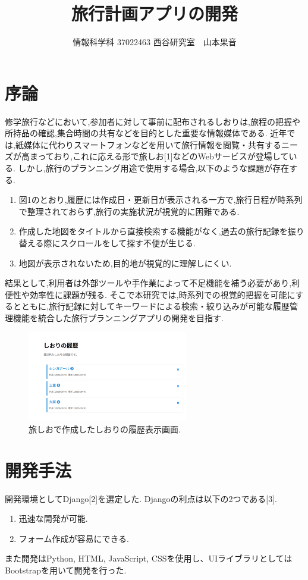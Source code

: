 \documentclass[a4j,twocolumn]{jsarticle}
\begin{document}
  \title{旅行計画アプリの開発}
  \author{情報科学科 \hspace{5mm} 37022463 \hspace{5mm} 西谷研究室　山本果音}
  \date{}

  \maketitle


\section{序論}
\label{sec:org1c60c1a}
修学旅行などにおいて,参加者に対して事前に配布されるしおりは,旅程の把握や所持品の確認,集合時間の共有などを目的とした重要な情報媒体である.
近年では,紙媒体に代わりスマートフォンなどを用いて旅行情報を閲覧・共有するニーズが高まっており,これに応える形で旅しお[1]などのWebサービスが登場している.
しかし,旅行のプランニング用途で使用する場合,以下のような課題が存在する.
\begin{enumerate}
\item 図1のとおり,履歴には作成日・更新日が表示される一方で,旅行日程が時系列で整理されておらず,旅行の実施状況が視覚的に困難である.
\item 作成した地図をタイトルから直接検索する機能がなく,過去の旅行記録を振り替える際にスクロールをして探す不便が生じる.
\item 地図が表示されないため,目的地が視覚的に理解しにくい.
\end{enumerate}
結果として,利用者は外部ツールや手作業によって不足機能を補う必要があり,利便性や効率性に課題が残る.
そこで本研究では,時系列での視覚的把握を可能にするとともに,旅行記録に対してキーワードによる検索・絞り込みが可能な履歴管理機能を統合した旅行プランニングアプリの開発を目指す.


\begin{figure}[htbp]
\centering
\includegraphics[width=7cm]{./figs/rireki1.png}
\caption{\label{fig:orgf0549a5}旅しおで作成したしおりの履歴表示画面.}
\end{figure}


\section{開発手法}
\label{sec:org604f3b5}
開発環境としてDjango[2]を選定した.
Djangoの利点は以下の2つである[3].
\begin{enumerate}
\item 迅速な開発が可能.
\item フォーム作成が容易にできる.
\end{enumerate}
また開発はPython, HTML, JavaScript, CSSを使用し、UIライブラリとしてはBootstrapを用いて開発を行った.
\end{document}
